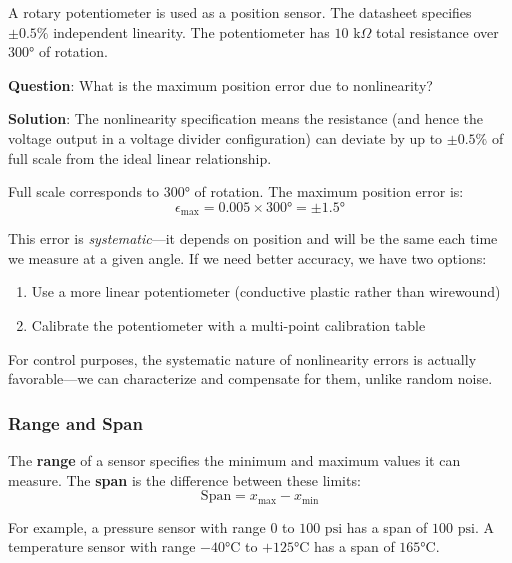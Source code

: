 \begin{example}
\label{ex:pot_nonlinearity}

A rotary potentiometer is used as a position sensor. The datasheet specifies $\pm 0.5\%$ independent linearity. The potentiometer has $10\text{ k}\Omega$ total resistance over $300°$ of rotation.

\textbf{Question}: What is the maximum position error due to nonlinearity?

\textbf{Solution}: The nonlinearity specification means the resistance (and hence the voltage output in a voltage divider configuration) can deviate by up to $\pm 0.5\%$ of full scale from the ideal linear relationship.

Full scale corresponds to $300°$ of rotation. The maximum position error is:
\begin{equation}
\epsilon_{\text{max}} = 0.005 \times 300° = \pm 1.5°
\end{equation}

This error is \textit{systematic}---it depends on position and will be the same each time we measure at a given angle. If we need better accuracy, we have two options:
\begin{enumerate}
    \item Use a more linear potentiometer (conductive plastic rather than wirewound)
    \item Calibrate the potentiometer with a multi-point calibration table
\end{enumerate}

For control purposes, the systematic nature of nonlinearity errors is actually favorable---we can characterize and compensate for them, unlike random noise.
\end{example}

\subsubsection{Range and Span}

The \textbf{range} of a sensor specifies the minimum and maximum values it can measure. The \textbf{span} is the difference between these limits:
\begin{equation}
\text{Span} = x_{\text{max}} - x_{\text{min}}
\label{eq:span}
\end{equation}

For example, a pressure sensor with range $0$ to $100\text{ psi}$ has a span of $100\text{ psi}$. A temperature sensor with range $-40°\text{C}$ to $+125°\text{C}$ has a span of $165°\text{C}$.

